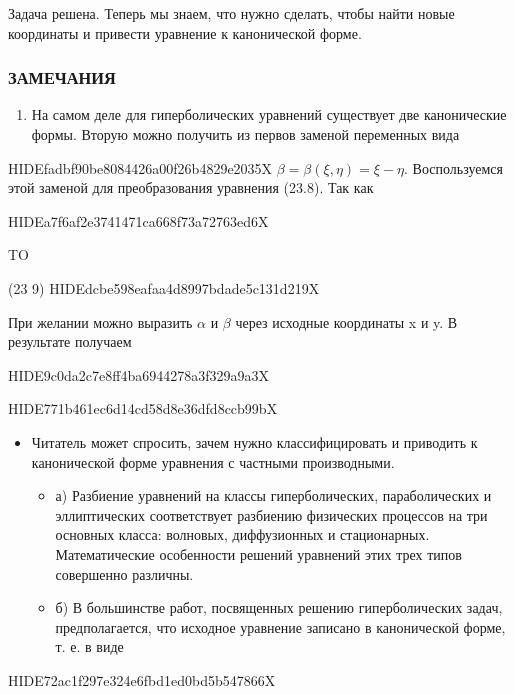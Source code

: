 \documentclass[
  ukrainian,
]{article}
\providecommand{\tightlist}{%
  \setlength{\itemsep}{0pt}\setlength{\parskip}{0pt}}
\begin{document}
Задача решена. Теперь мы знаем, что нужно сделать, чтобы найти новые
координаты и привести уравнение к канонической форме.

\subsubsection{ЗАМЕЧАНИЯ}\label{ux437ux430ux43cux435ux447ux430ux43dux438ux44f}

\begin{enumerate}
\def\labelenumi{\arabic{enumi}.}
\tightlist
\item
  На самом деле для гиперболических уравнений существует две
  канонические формы. Вторую можно получить из первов заменой переменных
  вида
\end{enumerate}

HIDEfadbf90be8084426a00f26b4829e2035X
\(\beta = \beta (\xi, \eta) = \xi - \eta.\) Воспользуемся этой заменой
для преобразования уравнения (23.8). Так как

HIDEa7f6af2e3741471ca668f73a72763ed6X

TO

(23 9) HIDEdcbe598eafaa4d8997bdade5c131d219X

При желании можно выразить \(\alpha\) и \(\beta\) через исходные
координаты x и y. В результате получаем

HIDE9c0da2c7e8ff4ba6944278a3f329a9a3X

HIDE771b461ec6d14cd58d8e36dfd8ccb99bX

\begin{itemize}
\tightlist
\item
  Читатель может спросить, зачем нужно классифицировать и приводить к
  канонической форме уравнения с частными производными.

  \begin{itemize}
  \tightlist
  \item
    а) Разбиение уравнений на классы гиперболических, параболических и
    эллиптических соответствует разбиению физических процессов на три
    основных класса: волновых, диффузионных и стационарных.
    Математические особенности решений уравнений этих трех типов
    совершенно различны.
  \item
    б) В большинстве работ, посвященных решению гиперболических задач,
    предполагается, что исходное уравнение записано в канонической
    форме, т. е. в виде
  \end{itemize}
\end{itemize}

HIDE72ac1f297e324e6fbd1ed0bd5b547866X
\end{document}
